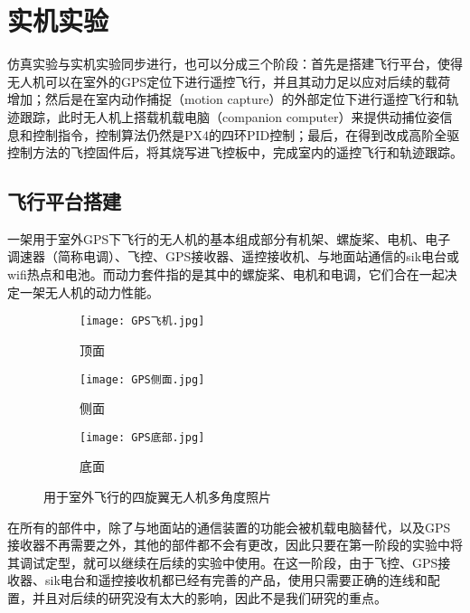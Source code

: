 \chapter{实机实验}
仿真实验与实机实验同步进行，也可以分成三个阶段：首先是搭建飞行平台，使得无人机可以在室外的GPS定位下进行遥控飞行，并且其动力足以应对后续的载荷增加；然后是在室内动作捕捉（motion capture）的外部定位下进行遥控飞行和轨迹跟踪，此时无人机上搭载机载电脑（companion computer）来提供动捕位姿信息和控制指令，控制算法仍然是PX4的四环PID控制；最后，在得到改成高阶全驱控制方法的飞控固件后，将其烧写进飞控板中，完成室内的遥控飞行和轨迹跟踪。
\section{飞行平台搭建}
一架用于室外GPS下飞行的无人机的基本组成部分有机架、螺旋桨、电机、电子调速器（简称电调）、飞控、GPS接收器、遥控接收机、与地面站通信的sik电台或wifi热点和电池。而动力套件指的是其中的螺旋桨、电机和电调，它们合在一起决定一架无人机的动力性能。
\begin{figure}[h]
  \centering
  \begin{subfigure}[c]{0.33\textwidth}
    \centering
    \texttt{[image: GPS飞机.jpg]}
    \caption{顶面}
  \end{subfigure} \hfill
  \begin{subfigure}[c]{0.33\textwidth}
    \centering
    \texttt{[image: GPS侧面.jpg]}
    \caption{侧面}
  \end{subfigure}\hfill
    \begin{subfigure}[c]{0.33\textwidth}
      \centering
      \texttt{[image: GPS底部.jpg]}
      \caption{底面}
  \end{subfigure}
  \caption{用于室外飞行的四旋翼无人机多角度照片}
  \end{figure}


在所有的部件中，除了与地面站的通信装置的功能会被机载电脑替代，以及GPS接收器不再需要之外，其他的部件都不会有更改，因此只要在第一阶段的实验中将其调试定型，就可以继续在后续的实验中使用。在这一阶段，由于飞控、GPS接收器、sik电台和遥控接收机都已经有完善的产品，使用只需要正确的连线和配置，并且对后续的研究没有太大的影响，因此不是我们研究的重点。


